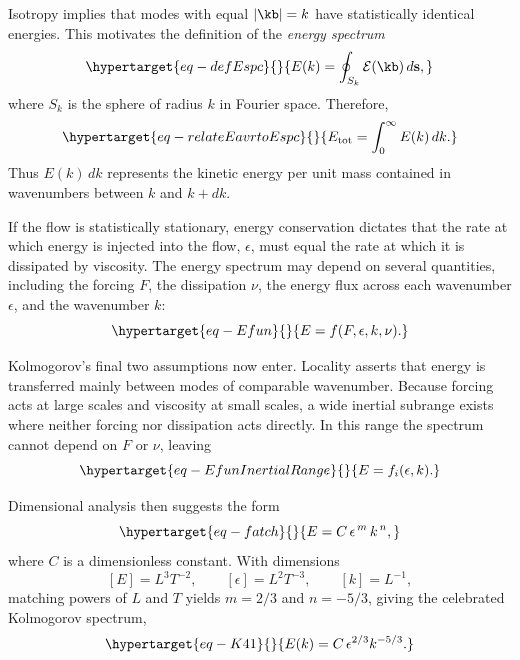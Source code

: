 \documentclass[
  letterpaper,
  twocolumn,
  landscape]{report}
\begin{document}
Isotropy implies that modes with equal \(|\kb|=k\) have statistically
identical energies. This motivates the definition of the \emph{energy
spectrum} \begin{equation}\protect\hypertarget{eq-defEspc}{}{
E(k) = \oint_{S_k} \mathcal{E}(\kb)\, d\mathbf{s},
}\label{eq-defEspc}\end{equation} where \(S_k\) is the sphere of radius
\(k\) in Fourier space. Therefore,
\begin{equation}\protect\hypertarget{eq-relateEavrtoEspc}{}{
E_{\text{tot}} = \int_0^\infty E(k)\, dk.
}\label{eq-relateEavrtoEspc}\end{equation} Thus \(E(k)\,dk\) represents
the kinetic energy per unit mass contained in wavenumbers between \(k\)
and \(k+dk\).

If the flow is statistically stationary, energy conservation dictates
that the rate at which energy is injected into the flow, \(\epsilon\),
must equal the rate at which it is dissipated by viscosity. The energy
spectrum may depend on several quantities, including the forcing \(F\),
the dissipation \(\nu\), the energy flux across each wavenumber
\(\epsilon\), and the wavenumber \(k\):
\begin{equation}\protect\hypertarget{eq-Efun}{}{
E = f(F,\epsilon,k,\nu).
}\label{eq-Efun}\end{equation}

Kolmogorov's final two assumptions now enter. Locality asserts that
energy is transferred mainly between modes of comparable wavenumber.
Because forcing acts at large scales and viscosity at small scales, a
wide inertial subrange exists where neither forcing nor dissipation acts
directly. In this range the spectrum cannot depend on \(F\) or \(\nu\),
leaving \begin{equation}\protect\hypertarget{eq-EfunInertialRange}{}{
E = f_i(\epsilon,k).
}\label{eq-EfunInertialRange}\end{equation}

Dimensional analysis then suggests the form
\begin{equation}\protect\hypertarget{eq-fatch}{}{
E = C\,\epsilon^{\,m}\,k^{\,n},
}\label{eq-fatch}\end{equation} where \(C\) is a dimensionless constant.
With dimensions \[
[E]=L^3T^{-2},\qquad
[\epsilon]=L^2T^{-3},\qquad
[k]=L^{-1},
\] matching powers of \(L\) and \(T\) yields \(m=2/3\) and \(n=-5/3\),
giving the celebrated Kolmogorov spectrum,
\begin{equation}\protect\hypertarget{eq-K41}{}{
E(k) = C\,\epsilon^{2/3} k^{-5/3}.
}\label{eq-K41}\end{equation}
\end{document}
